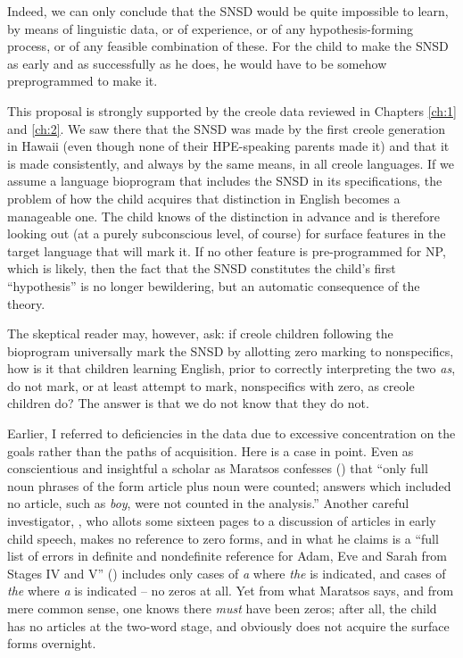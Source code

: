 Indeed, we can only conclude that the SNSD would be quite impossible to learn, by means of linguistic data, or of experience, or of any hypothesis-forming process, or of any feasible combination of these. For the child to make the SNSD as early and as successfully as he does, he would have to be somehow preprogrammed to make it.

This proposal is strongly supported by the creole data reviewed in Chapters \ref{ch:1} and \ref{ch:2}. We saw there that the SNSD was made by the first creole generation in Hawaii (even though none of their HPE-speaking parents made it) and that it is made consistently, and always by the same means, in all creole languages. If we assume a language bioprogram that includes the SNSD in its specifications, the problem of how the child acquires that distinction in English becomes a manageable one. The child knows of the distinction in advance and is therefore looking out (at a purely subconscious level, of course) for surface features in the target language that will mark it. If no other feature is pre-programmed for NP, which is likely, then the fact that the SNSD constitutes the child's first ``hypothesis'' is no longer bewildering, but an automatic consequence of the theory.

The skeptical reader may, however, ask: if creole children following the bioprogram universally mark the SNSD by allotting zero marking to nonspecifics, how is it that children learning English, prior to
correctly interpreting the two \textit{as}, do not mark, or at least attempt to mark, nonspecifics with zero, as creole children do? The answer is that we do not know that they do not.

Earlier, I referred to deficiencies in the data due to excessive concentration on the goals rather than the paths of acquisition. Here is a case in point. Even as conscientious and insightful a scholar as Maratsos confesses (\citeyear[450]{Maratsos1974}) that ``only full noun phrases of the form article plus noun were counted; answers which included no article, such as \textit{boy}, were not counted in the analysis.'' Another careful investigator, \citet{Brown1973}, who allots some sixteen pages to a discussion of articles in early child speech, makes no reference to zero forms, and in what he claims is a ``full list of errors in definite and nondefinite reference for Adam, Eve and Sarah from Stages IV and V'' (\citeyear[Table~51]{Brown1973}) includes only cases of \textit{a} where \textit{the} is indicated, and cases of \textit{the} where \textit{a} is indicated -- no zeros at all. Yet from what Maratsos says, and from mere common sense, one knows there \textit{must} have been zeros; after all, the child has no articles at the two-word stage, and obviously does not acquire the surface forms overnight.

